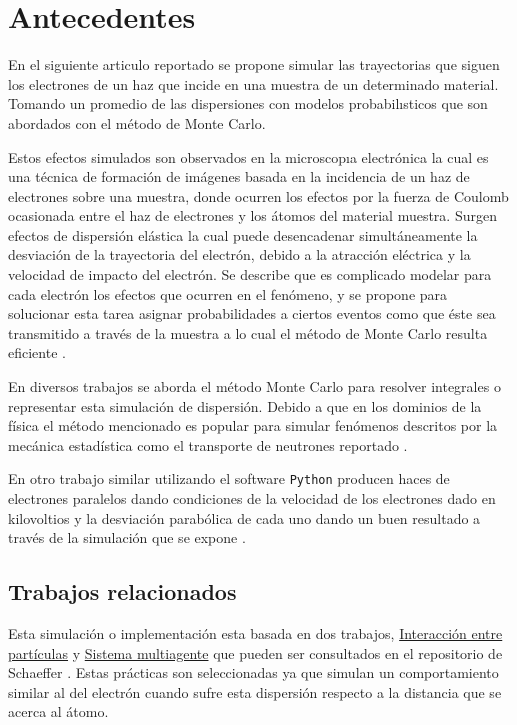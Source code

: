 \documentclass[3pt,twocolumn]{elsarticle}
\begin{document}
\section{Antecedentes}
En el siguiente articulo reportado se propone simular las trayectorias que siguen los electrones de un haz que incide en una muestra de un determinado material. Tomando un promedio de las dispersiones con modelos probabilısticos que son abordados con el método de Monte Carlo.

Estos efectos simulados son observados en la microscopıa electrónica la cual es una técnica de formación de imágenes basada en la incidencia de un haz de electrones sobre una muestra, donde ocurren los efectos por la fuerza de Coulomb ocasionada entre el haz de electrones y los átomos del material muestra. Surgen efectos de dispersión elástica la cual puede desencadenar simultáneamente la desviación de la trayectoria del electrón, debido a la atracción eléctrica y la velocidad de impacto del electrón.
Se describe que es complicado modelar para cada electrón los efectos que ocurren en el fenómeno, y se propone para solucionar esta tarea asignar probabilidades a ciertos eventos como que éste sea transmitido a través de la muestra a lo cual el método de Monte Carlo resulta eficiente \cite{saenzsimulacion}.

En diversos trabajos se aborda el método Monte Carlo para resolver integrales o representar esta simulación de dispersión. 
Debido a que en los dominios de la física el método mencionado es popular para simular fenómenos descritos por la mecánica estadística como el transporte de neutrones reportado \cite{rubinstein2016simulation}.

En otro trabajo similar utilizando el software \texttt{Python} producen haces de electrones paralelos dando condiciones de la velocidad de los electrones dado en kilovoltios y la desviación parabólica de cada uno dando un buen resultado a través de la simulación que se expone \cite{feng2017beam}.

\subsection{Trabajos relacionados}
Esta simulación o implementación esta basada en dos trabajos, \href{https://satuelisa.github.io/simulation/p9.html}{Interacción entre partículas} y \href{https://satuelisa.github.io/simulation/p6.html}{Sistema multiagente} que pueden ser consultados en el repositorio de Schaeffer \cite{elisa}. Estas prácticas son seleccionadas ya que simulan un comportamiento similar al del electrón cuando sufre esta dispersión respecto a la distancia que se acerca al átomo.
\end{document}
